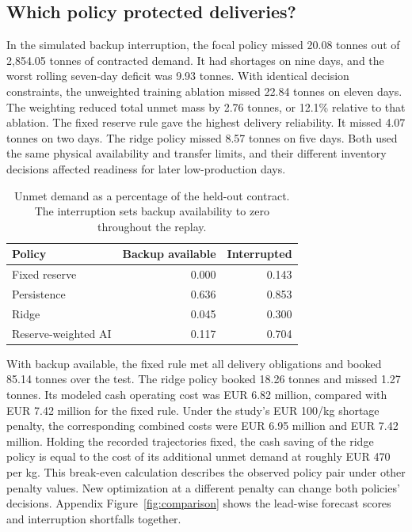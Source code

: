 \subsection{Which policy protected deliveries?}
In the simulated backup interruption, the focal policy missed 20.08 tonnes out of 2{,}854.05 tonnes of contracted demand. It had shortages on nine days, and the worst rolling seven-day deficit was 9.93 tonnes. With identical decision constraints, the unweighted training ablation missed 22.84 tonnes on eleven days. The weighting reduced total unmet mass by 2.76 tonnes, or 12.1\% relative to that ablation. The fixed reserve rule gave the highest delivery reliability. It missed 4.07 tonnes on two days. The ridge policy missed 8.57 tonnes on five days. Both used the same physical availability and transfer limits, and their different inventory decisions affected readiness for later low-production days.

\begin{table}[t]
\centering\small
\caption{Unmet demand as a percentage of the held-out contract. The interruption sets backup availability to zero throughout the replay.}
\label{tab:operations}
\begin{tabular}{@{}lrr@{}}
\toprule
Policy & Backup available & Interrupted \\
\midrule
Fixed reserve & 0.000 & 0.143 \\
Persistence & 0.636 & 0.853 \\
Ridge & 0.045 & 0.300 \\
Reserve-weighted AI & 0.117 & 0.704 \\
\bottomrule
\end{tabular}
\end{table}

With backup available, the fixed rule met all delivery obligations and booked 85.14 tonnes over the test. The ridge policy booked 18.26 tonnes and missed 1.27 tonnes. Its modeled cash operating cost was EUR 6.82 million, compared with EUR 7.42 million for the fixed rule. Under the study's EUR 100/kg shortage penalty, the corresponding combined costs were EUR 6.95 million and EUR 7.42 million. Holding the recorded trajectories fixed, the cash saving of the ridge policy is equal to the cost of its additional unmet demand at roughly EUR 470 per kg. This break-even calculation describes the observed policy pair under other penalty values. New optimization at a different penalty can change both policies' decisions. Appendix Figure~\ref{fig:comparison} shows the lead-wise forecast scores and interruption shortfalls together.

